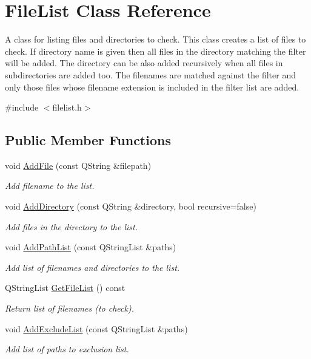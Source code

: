 \hypertarget{class_file_list}{\section{File\-List Class Reference}
\label{class_file_list}
}


A class for listing files and directories to check. This class creates a list of files to check. If directory name is given then all files in the directory matching the filter will be added. The directory can be also added recursively when all files in subdirectories are added too. The filenames are matched against the filter and only those files whose filename extension is included in the filter list are added.  




{\ttfamily \#include $<$filelist.\-h$>$}

\subsection*{Public Member Functions}
\begin{DoxyCompactItemize}
\item 
void \hyperlink{class_file_list_a7e30db56b6cc6a68d56056df0e913b80}{Add\-File} (const Q\-String \&filepath)
\begin{DoxyCompactList}\small\item\em Add filename to the list. \end{DoxyCompactList}\item 
void \hyperlink{class_file_list_ad10d27166ae697f6d5fa424fc86bb6bd}{Add\-Directory} (const Q\-String \&directory, bool recursive=false)
\begin{DoxyCompactList}\small\item\em Add files in the directory to the list. \end{DoxyCompactList}\item 
void \hyperlink{class_file_list_a42c392558cccd7a574848f83ef844474}{Add\-Path\-List} (const Q\-String\-List \&paths)
\begin{DoxyCompactList}\small\item\em Add list of filenames and directories to the list. \end{DoxyCompactList}\item 
Q\-String\-List \hyperlink{class_file_list_ab9938c1da4df4745465e4d51fce79007}{Get\-File\-List} () const 
\begin{DoxyCompactList}\small\item\em Return list of filenames (to check). \end{DoxyCompactList}\item 
void \hyperlink{class_file_list_ae73a44a151db7c010a51e3b14384094e}{Add\-Exclude\-List} (const Q\-String\-List \&paths)
\begin{DoxyCompactList}\small\item\em Add list of paths to exclusion list. \end{DoxyCompactList}\end{DoxyCompactItemize}
